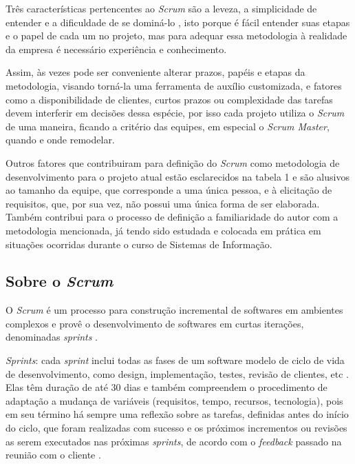 Três características pertencentes ao \textit{Scrum} são a leveza, a simplicidade de entender e a dificuldade de se dominá-lo , isto porque é fácil entender suas etapas e o papel de cada um no projeto, mas para adequar essa metodologia à realidade da empresa é necessário experiência e conhecimento.

Assim, às vezes pode ser conveniente alterar prazos, papéis e etapas da metodologia, visando torná-la uma ferramenta de auxílio customizada, e fatores como a disponibilidade de clientes, curtos prazos ou complexidade das tarefas devem interferir em decisões dessa espécie, por isso cada projeto utiliza o \textit{Scrum} de uma maneira, ficando a critério das equipes, em especial o \textit{Scrum Master}, quando e onde remodelar.

Outros fatores que contribuiram para definição do \textit{Scrum} como metodologia de desenvolvimento para o projeto atual estão esclarecidos na tabela 1 e são alusivos ao tamanho da equipe, que corresponde a uma única pessoa, e à elicitação de requisitos, que, por sua vez, não possui uma única forma de ser elaborada. Também contribui para o processo de definição a familiaridade do autor com a metodologia mencionada, já tendo sido estudada e colocada em prática em situações ocorridas durante o curso de Sistemas de Informação.
 
\hspace{2.5cm}
\subsection{Sobre o \textit{Scrum}}
\hspace{2.5cm}

O \textit{Scrum} é um processo para construção incremental de softwares em ambientes complexos e provê o desenvolvimento de softwares em curtas iterações, denominadas \textit{sprints} .

\textit{Sprints}: cada \textit{sprint} inclui todas as fases de um software modelo de ciclo de vida de desenvolvimento, como design, implementação, testes, revisão de clientes, etc \cite[~p. 2, tradução nossa]{matharu2015empirical}. Elas têm duração de até 30 dias e também compreendem o procedimento de adaptação a mudança de variáveis (requisitos, tempo, recursos, tecnologia), pois em seu término há sempre uma reflexão sobre as tarefas, definidas antes do início do ciclo, que foram realizadas com sucesso e os próximos incrementos ou revisões as serem executados nas próximas \textit{sprints}, de acordo com o \textit{feedback} passado na reunião com o cliente . 

